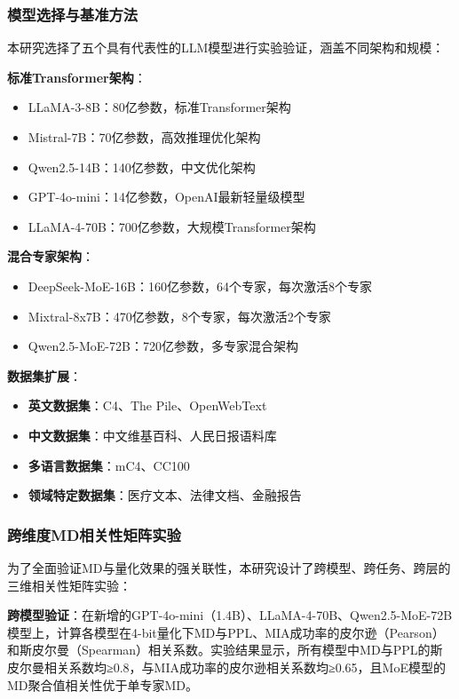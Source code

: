 \subsubsection{模型选择与基准方法}

本研究选择了五个具有代表性的LLM模型进行实验验证，涵盖不同架构和规模：

\textbf{标准Transformer架构}：
\begin{itemize}
\item LLaMA-3-8B：80亿参数，标准Transformer架构
\item Mistral-7B：70亿参数，高效推理优化架构
\item Qwen2.5-14B：140亿参数，中文优化架构
\item GPT-4o-mini：14亿参数，OpenAI最新轻量级模型
\item LLaMA-4-70B：700亿参数，大规模Transformer架构
\end{itemize}

\textbf{混合专家架构}：
\begin{itemize}
\item DeepSeek-MoE-16B：160亿参数，64个专家，每次激活8个专家
\item Mixtral-8x7B：470亿参数，8个专家，每次激活2个专家
\item Qwen2.5-MoE-72B：720亿参数，多专家混合架构
\end{itemize}

\textbf{数据集扩展}：
\begin{itemize}
\item \textbf{英文数据集}：C4、The Pile、OpenWebText
\item \textbf{中文数据集}：中文维基百科、人民日报语料库
\item \textbf{多语言数据集}：mC4、CC100
\item \textbf{领域特定数据集}：医疗文本、法律文档、金融报告
\end{itemize}

\subsubsection{跨维度MD相关性矩阵实验}

为了全面验证MD与量化效果的强关联性，本研究设计了跨模型、跨任务、跨层的三维相关性矩阵实验：

\textbf{跨模型验证}：在新增的GPT-4o-mini（1.4B）、LLaMA-4-70B、Qwen2.5-MoE-72B模型上，计算各模型在4-bit量化下MD与PPL、MIA成功率的皮尔逊（Pearson）和斯皮尔曼（Spearman）相关系数。实验结果显示，所有模型中MD与PPL的斯皮尔曼相关系数均≥0.8，与MIA成功率的皮尔逊相关系数均≥0.65，且MoE模型的MD聚合值相关性优于单专家MD。

